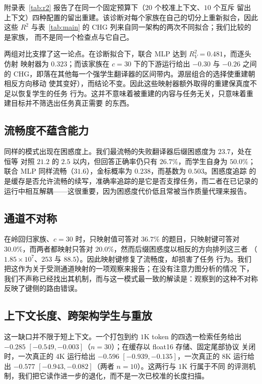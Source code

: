 \documentclass[10pt,a4paper,fontset=fandol]{ctexart}
\begin{document}
附录表~\ref{tab:r2} 报告了在同一个固定预算下（$20$ 个校准上下文、$10$ 个互斥
留出上下文）四种配置的留出重建。该诊断对每个家族在自己的切分上重新拟合，因此这些
$R^2$ 与表~\ref{tab:main} 的 CHG 列来自同一架构的两次不同拟合；我们比较的是家族，
而不是同一个检查点与它自己。

两组对比支撑了这一论点。在诊断拟合下，联合 MLP 达到 $R^2_V = 0.481$，而逐头仿射
映射器为 $0.323$；而该家族在 $c{=}30$ 下的下游运行给出 $-0.30$ 与 $-0.26$ 之间的
CHG，即落在其他每一个强学生翻译器的区间带内。源层组合的选择使重建朝相反方向移动
使其变好），而结论不变。因此这些映射器额外取得的重建保真度不足以恢复学生的任务
行为。这并不意味着被重建的内容与任务无关，只意味着重建目标并不筛选出任务真正需要
的东西。

\subsection{流畅度不蕴含能力}

同样的模式出现在困惑度上。我们最流畅的失败翻译器后缀困惑度为 $23.7$，处在恒等
对照 $21.2$ 的 $2.5$ 以内，但回答正确率仍只有 $26.7\%$，而学生自身为 $50.0\%$；
联合 MLP 同样流畅（$31.6$），金标概率为 $0.238$，而基数为 $0.503$。困惑度追踪
的是缓存是否允许流畅的续写，准确率追踪的是它是否支撑任务，而二者在已记录的
运行中相互解耦——这很重要，因为困惑度代价低且常被当作质量代理来报告。

\subsection{通道不对称}

在岭回归家族、$c{=}30$ 时，只映射值可答对 $36.7\%$ 的题目，只映射键可答对
$30.0\%$，而两者都映射只答对 $20.0\%$，然而后缀困惑度以相反的方向排列这三者
（$1.85\times10^{7}$、$253$ 与 $88.5$）。因此映射键修复了流畅度，却损害了任务
行为。我们把这作为关于受测通道映射的一项观察来报告；在没有注意力图分析的情况
下，我们不声称已经找出其机制，而与这一模式最一致的解读是：观察到的这种不对称
反映了键侧的路由错误。

\subsection{上下文长度、跨架构学生与重放}

这一缺口并不限于短上下文。一个打包到约 $1$K token 的四选一检索任务给出
$-0.285$ $[-0.549,-0.003]$（$n{=}30$）；在缓存以 float16 存储、固定尾部协议
关闭时，一次真正的 $4$K 运行给出 $-0.596$ $[-0.939,-0.135]$，一次真正的 $8$K
运行给出 $-0.577$ $[-0.943,-0.082]$（两者 $n{=}10$）。这两行与 $1$K 行属于不同
的评测机制，我们把它读作进一步的退化，而不是一次已校准的长度扫描。
\end{document}

